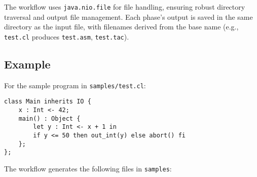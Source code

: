 \documentclass[11pt, titlepage]{article}
\begin{document}
The workflow uses \texttt{java.nio.file} for file handling, ensuring robust directory traversal and output file management. Each phase's output is saved in the same directory as the input file, with filenames derived from the base name (e.g., \texttt{test.cl} produces \texttt{test.asm}, \texttt{test.tac}).

\subsection{Example}
For the sample program in \texttt{samples/test.cl}:
\begin{lstlisting}
class Main inherits IO {
    x : Int <- 42;
    main() : Object {
        let y : Int <- x + 1 in
        if y <= 50 then out_int(y) else abort() fi
    };
};
\end{lstlisting}
The workflow generates the following files in \texttt{samples}:
\end{document}
